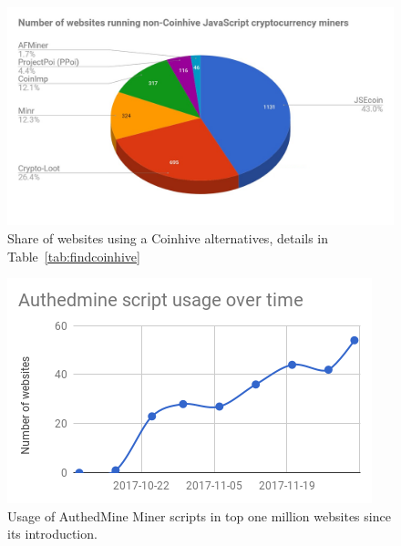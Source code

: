 \begin{figure}[t]
\centering
\includegraphics[width=0.9\linewidth]{figures/non-coinhive-miners-pie.png}
\caption{Share of websites using a Coinhive alternatives, details in Table~\ref{tab:findcoinhive}  \label{fig:copycat}}
\end{figure}

\begin{figure}[t]
\centering
\includegraphics[width=0.9\linewidth]{figures/usage_of_authedmine_over_time.png}
	\caption{Usage of AuthedMine Miner scripts in top one million websites since its introduction.\label{fig:authmine}}
\end{figure}


